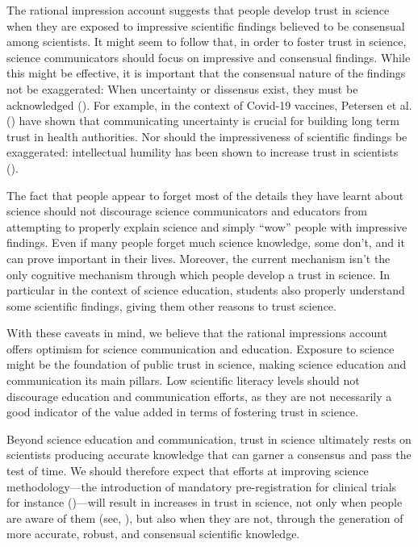 \documentclass[
  jou,
  floatsintext,
  longtable,
  nolmodern,
  notxfonts,
  notimes,
  colorlinks=true,linkcolor=blue,citecolor=blue,urlcolor=blue]{apa7}
\begin{document}
The rational impression account suggests that people develop trust in
science when they are exposed to impressive scientific findings believed
to be consensual among scientists. It might seem to follow that, in
order to foster trust in science, science communicators should focus on
impressive and consensual findings. While this might be effective, it is
important that the consensual nature of the findings not be exaggerated:
When uncertainty or dissensus exist, they must be acknowledged
(). For example, in the context of Covid-19 vaccines, Petersen et
al. ()
have shown that communicating uncertainty is crucial for building long
term trust in health authorities. Nor should the impressiveness of
scientific findings be exaggerated: intellectual humility has been shown
to increase trust in scientists
().

The fact that people appear to forget most of the details they have
learnt about science should not discourage science communicators and
educators from attempting to properly explain science and simply ``wow''
people with impressive findings. Even if many people forget much science
knowledge, some don't, and it can prove important in their lives.
Moreover, the current mechanism isn't the only cognitive mechanism
through which people develop a trust in science. In particular in the
context of science education, students also properly understand some
scientific findings, giving them other reasons to trust science.

With these caveats in mind, we believe that the rational impressions
account offers optimism for science communication and education.
Exposure to science might be the foundation of public trust in science,
making science education and communication its main pillars. Low
scientific literacy levels should not discourage education and
communication efforts, as they are not necessarily a good indicator of
the value added in terms of fostering trust in science.

Beyond science education and communication, trust in science ultimately
rests on scientists producing accurate knowledge that can garner a
consensus and pass the test of time. We should therefore expect that
efforts at improving science methodology---the introduction of mandatory
pre-registration for clinical trials for instance
()---will result in increases in trust in science, not only when
people are aware of them (see,
), but
also when they are not, through the generation of more accurate, robust,
and consensual scientific knowledge.
\end{document}
